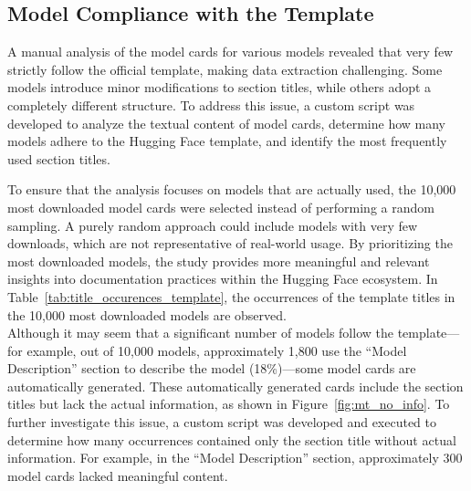\documentclass[12pt,a4paper, oneside, openright]{book}
\begin{document}
\subsection{Model Compliance with the Template}
A manual analysis of the model cards for various models revealed that very few strictly follow the official template, making data extraction challenging. Some models introduce minor modifications to section titles, while others adopt a completely different structure. To address this issue, a custom script was developed to analyze the textual content of model cards, determine how many models adhere to the Hugging Face template, and identify the most frequently used section titles.

To ensure that the analysis focuses on models that are actually used, the 10,000 most downloaded model cards were selected instead of performing a random sampling. A purely random approach could include models with very few downloads, which are not representative of real-world usage. 
By prioritizing the most downloaded models, the study provides more meaningful and relevant insights into documentation practices within the Hugging Face ecosystem.
In Table~\ref{tab:title_occurences_template}, the occurrences of the template titles in the 10,000 most downloaded models are observed.\\
Although it may seem that a significant number of models follow the template—for example, out of 10,000 models, approximately 1,800 use the ``Model Description'' section to describe the model (18\%)—some model cards are automatically generated. These automatically generated cards include the section titles but lack the actual information, as shown in Figure~\ref{fig:mt_no_info}.
To further investigate this issue, a custom script was developed and executed to determine how many occurrences contained only the section title without actual information.  For example, in the ``Model Description'' section, approximately 300 model cards lacked meaningful content.
\end{document}
